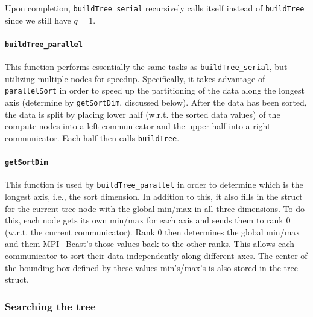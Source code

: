 \documentclass{article}
\begin{document}
%
%

Upon completion, \texttt{buildTree\_serial} recursively calls itself instead of \texttt{buildTree} since we still have $q=1$.


\paragraph{\texttt{buildTree\_parallel}}
This function performs essentially the same tasks as \texttt{buildTree\_serial}, but utilizing multiple nodes for speedup. Specifically, it takes advantage of \texttt{parallelSort} in order to speed up the partitioning of the data along the longest axis (determine by \texttt{getSortDim}, discussed below). After the data has been sorted, the data is split by placing lower half (w.r.t. the sorted data values) of the compute nodes into a left communicator and the upper half into a right communicator. Each half then calls \texttt{buildTree}.



\paragraph{\texttt{getSortDim}}
This function is used by \texttt{buildTree\_parallel} in order to determine which is the longest axis, i.e., the sort dimension. In addition to this, it also fills in the struct for the current tree node with the global min/max in all three dimensions. To do this, each node gets its own min/max for each axis and sends them to rank 0 (w.r.t. the current communicator). Rank 0 then determines the global min/max and them MPI\_Bcast's those values back to the other ranks. This allows each communicator to sort their data independently along different axes. The center of the bounding box defined by these values min's/max's is also stored in the tree struct. 


\subsubsection{Searching the tree}
\end{document}
